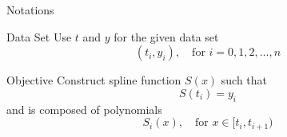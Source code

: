 \documentclass[10pt]{beamer}
\begin{document}
\begin{frame}[shrink]{Notations}
\begin{block}{Data Set}
    Use $t$ and $y$ for the given data set
    $$
        (t_i,y_i),\quad \text{for }i=0,1,2,\dots, n
    $$
\end{block}

\begin{block}{Objective}
    Construct spline function $S(x)$ such that 
    $$
        S(t_i)=y_i
    $$
    and is composed of polynomials
    $$
        S_i(x),\quad \text{for } x\in[t_i,t_{i+1})
    $$
\end{block}


\end{frame}

\end{document}
